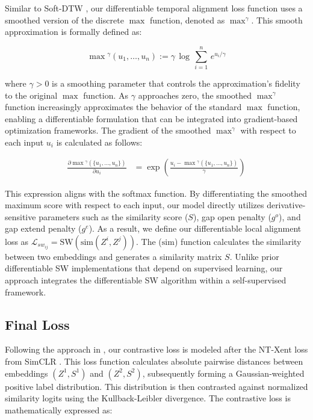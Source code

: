 Similar to Soft-DTW \cite{2017_softdtw}, our differentiable temporal alignment loss function uses a smoothed version of the discrete $\max$ function, denoted as $\max^\gamma$. This smooth approximation is formally defined as:

\begin{equation}
  \max{}^{\gamma}(u_1, \ldots, u_n) := \gamma \, \log \, \sum_{i=1}^{n} \, e^{u_i/\gamma}  \label{eq: smooth_max}
\end{equation}

where $\gamma > 0$ is a smoothing parameter that controls the approximation's fidelity to the original $\max$ function. As $\gamma$ approaches zero, the smoothed $\max^\gamma$ function increasingly approximates the behavior of the standard $\max$ function, enabling a differentiable formulation that can be integrated into gradient-based optimization frameworks. The gradient of the smoothed $\max^\gamma$ with respect to each input $u_i$ is calculated as follows:

\begin{align}
    \frac{\partial \max{}^\gamma(\{u_1,\ldots, u_n\})}{\partial u_i} & = \exp\left(\frac{u_i - \max{}^\gamma(\{u_1,\ldots,u_n\})}{\gamma}\right)
    \label{eq: partial_softmax}
\end{align}

This expression aligns with the softmax function. 
By differentiating the smoothed maximum score with respect to each input, our model directly utilizes derivative-sensitive parameters such as the similarity score ($S$), gap open penalty ($g^o$), and gap extend penalty ($g^e$). 
As a result, we define our differentiable local alignment loss as \(\mathcal{L}_{sw_{ij}} = \text{SW}(\text{sim}(Z^i, Z^j))\).
The ($\text{sim}$) function calculates the similarity between two embeddings and generates a similarity matrix $S$. 
Unlike prior differentiable SW implementations \cite{2023_sw1, 2023_sw2} that depend on supervised learning, our approach integrates the differentiable SW algorithm within a self-supervised framework.

\subsection{Final Loss} \label{sec: 3_total}

Following the approach in \cite{2022_carl}, our contrastive loss is modeled after the NT-Xent loss from SimCLR \cite{2020_simclr}. 
This loss function calculates absolute pairwise distances between embeddings $(Z^1, S^1)$ and $(Z^2, S^2)$,  subsequently forming a Gaussian-weighted positive label distribution.
This distribution is then contrasted against normalized similarity logits using the Kullback-Leibler divergence. 
The contrastive loss is mathematically expressed as:

